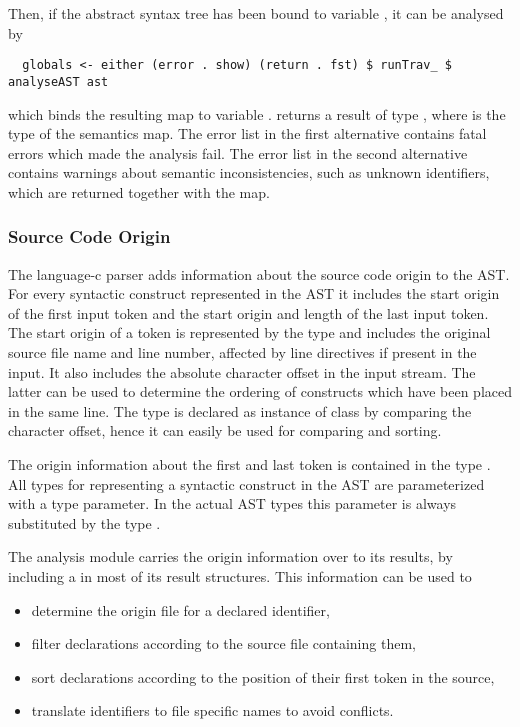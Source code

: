 Then, if the abstract syntax tree has been bound to variable , it can be analysed by
\begin{verbatim}
  globals <- either (error . show) (return . fst) $ runTrav_ $ analyseAST ast
\end{verbatim}
which binds the resulting map to variable . 
returns a result of type , where 
is the type of the semantics map. The error list in the first alternative contains fatal errors which made the analysis fail. 
The error list in the second alternative contains warnings about semantic inconsistencies, such as unknown identifiers,
which are returned together with the map. 

\subsubsection{Source Code Origin}

The language-c parser adds information about the source code origin to the AST. For every syntactic construct represented
in the AST it includes the start origin of the first input token and the start origin and length of the last input token.
The start origin of a token is represented by the type  and includes the original source file name and 
line number, affected by line directives if present in the input. It also includes the absolute character offset in the 
input stream. The latter can be used to determine the ordering of constructs which have been placed in the same line.
The type  is declared as instance of class  by comparing the character offset, hence it can 
easily be used for comparing and sorting.

The origin information about the first and last token is contained in the type . All types for representing
a syntactic construct in the AST are parameterized with a type parameter. In the actual AST types this parameter is always 
substituted by the type . 

The analysis module carries the origin information over to its results, by including a  in most of its
result structures. This information can be used to
\begin{itemize}
\item determine the origin file for a declared identifier,
\item filter declarations according to the source file containing them,
\item sort declarations according to the position of their first token in the source,
\item translate identifiers to file specific names to avoid conflicts.
\end{itemize}

